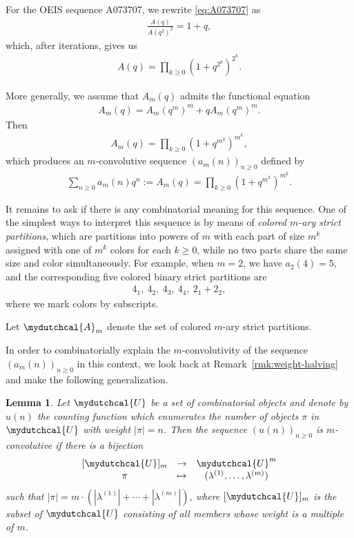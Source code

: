 \documentclass[12pt,reqno]{amsart}
\numberwithin{equation}{section}
\theoremstyle{plain}
\newtheorem{lemma}[theorem]{Lemma}
\theoremstyle{definition}
\theoremstyle{named}
\newcommand{\cA}{\mydutchcal{A}}
\newcommand{\cU}{\mydutchcal{U}}
\begin{document}
For the OEIS sequence A073707, we rewrite \eqref{eq:A073707} as
\begin{align*}
	\frac{A(q)}{A(q^2)^2} = 1+q,
\end{align*}
which, after iterations, gives us
\begin{align}
	A(q) = \prod_{k\ge 0} (1+q^{2^k})^{2^k}.
\end{align}

More generally, we assume that $A_m(q)$ admits the functional equation
\begin{align}\label{eq:Am}
	A_m(q) = A_m(q^m)^m+qA_m(q^m)^m.
\end{align}
Then
\begin{align}
	A_m(q) = \prod_{k\ge 0} (1+q^{m^k})^{m^k},
\end{align}
which produces an $m$-convolutive sequence $(a_m(n))_{n\ge 0}$ defined by
\begin{align}
	\sum_{n\ge 0} a_m(n) q^n := A_m(q) = \prod_{k\ge 0} (1+q^{m^k})^{m^k}.
\end{align}

It remains to ask if there is any combinatorial meaning for this sequence. One of the simplest ways to interpret this sequence is by means of \emph{colored $m$-ary strict partitions}, which are partitions into powers of $m$ with each part of size $m^k$ assigned with one of $m^k$ colors for each $k\ge 0$, while no two parts share the same size and color simultaneously. For example, when $m=2$, we have $a_2(4)=5$, and the corresponding five colored binary strict partitions are
\begin{align*}
	4_1,\  4_2,\  4_3,\  4_4,\  2_1+2_2,
\end{align*}
where we mark colors by subscripts.

Let $\cA_m$ denote the set of colored $m$-ary strict partitions.

In order to combinatorially explain the $m$-convolutivity of the sequence $(a_m(n))_{n\ge 0}$ in this context, we look back at Remark~\ref{rmk:weight-halving} and make the following generalization.

\begin{lemma}
	Let $\cU$ be a set of combinatorial objects and denote by $u(n)$ the counting function which enumerates the number of objects $\pi$ in $\cU$ with weight $|\pi| = n$. Then the sequence $(u(n))_{n\ge 0}$ is $m$-convolutive if there is a bijection 
	\begin{align*}
		\begin{array}{ccc}
			[\cU]_m & \to & \cU^m\\
			\pi & \mapsto & (\lambda^{(1)},\ldots,\lambda^{(m)})
		\end{array}
	\end{align*}
	such that $|\pi| = m\cdot (|\lambda^{(1)}|+\cdots+|\lambda^{(m)}|)$, where $[\cU]_m$ is the subset of $\cU$ consisting of all members whose weight is a multiple of $m$.
\end{lemma}
\end{document}
